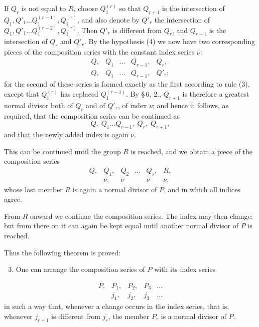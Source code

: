 \documentclass[11pt]{article}
\begin{document}
If $Q_r$ is not equal to $R$, choose $Q_1^{(r)}$ so that $Q_{r+1}$ is the intersection of $Q_1,Q'_1\ldots Q_1^{(r-1)},Q_1^{(r)}$, and also denote by $Q'_r$ the intersection of $Q_1,Q'_1\ldots Q_1^{(r-2)},Q_1^{(r)}$. Then $Q'_r$ is different from $Q_r$, and $Q_{r+1}$ is the intersection of $Q_r$ and $Q'_r$. By the hypothesis (4) we now have two corresponding pieces of the composition series with the constant index series $\nu$:
\begin{equation}
\begin{array}{ccccc}
Q,&Q_1&\ldots&Q_{r-1},&Q_r,\\
Q,&Q_1&\ldots&Q_{r-1},&Q'_r;
\end{array}
\tag{5}
\end{equation}
for the second of these series is formed exactly as the first according to rule (3), except that $Q_1^{(r)}$ has replaced $Q_1^{(r-1)}$. By \S\,6, 2., $Q_{r+1}$ is therefore a greatest normal divisor both of $Q_r$ and of $Q'_r$, of index $\nu$; and hence it follows, as required, that the composition series can be continued as
\begin{equation}
Q,\;Q_1\ldots Q_{r-1},\;Q_r,\;Q_{r+1},
\tag{6}
\end{equation}
and that the newly added index is again $\nu$.

This can be continued until the group $R$ is reached, and we obtain a piece of the composition series
\begin{equation}
\begin{array}{cccccc}
Q,&Q_1,&Q_2&\ldots&Q_s,&R,\\
&\nu,&\nu&&\nu&\nu,
\end{array}
\tag{7}
\end{equation}
whose last member $R$ is again a normal divisor of $P$, and in which all indices agree.

From $R$ onward we continue the composition series. The index may then change; but from there on it can again be kept equal until another normal divisor of $P$ is reached.

Thus the following theorem is proved:
\begin{enumerate}[label=\Roman*.]
\setcounter{enumi}{2}
\item One can arrange the composition series of $P$ with its index series
\end{enumerate}
\begin{equation}
\begin{array}{cccccc}
P,&P_1,&P_2,&P_3&\ldots\\
&j_1,&j_2,&j_3&\ldots
\end{array}
\tag{8}
\end{equation}
in such a way that, whenever a change occurs in the index series, that is, whenever $j_{r+1}$ is different from $j_r$, the member $P_r$ is a normal divisor of $P$.
\end{document}
